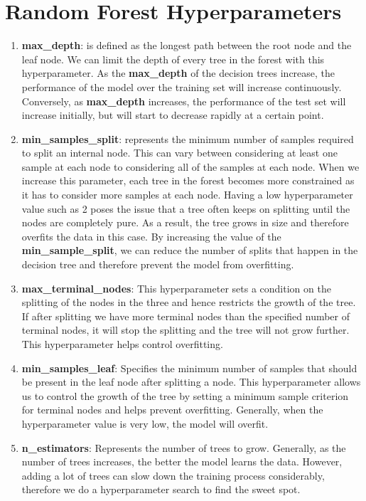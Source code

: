 \documentclass[12pt]{article}
\begin{document}
\section{Random Forest Hyperparameters}
\begin{enumerate}
    \item \textbf{max\_depth}: is defined as the longest path between the root node and the leaf node. We can limit the depth of every tree in the forest with this hyperparameter. As the \textbf{max\_depth} of the decision trees increase, the performance of the model over the training set will increase continuously. Conversely, as \textbf{max\_depth} increases, the performance of the test set will increase initially, but will start to decrease rapidly at a certain point.
    
    \item \textbf{min\_samples\_split}: represents the minimum number of samples required to split an internal node.  This can vary between considering at least one sample at each node to considering all of the samples at each node. When we increase this parameter, each tree in the forest becomes more constrained as it has to consider more samples at each node. Having a low hyperparameter value such as 2 poses the issue that a tree often keeps on splitting until the nodes are completely pure. As a result, the tree grows in size and therefore overfits the data in this case. By increasing the value of the \textbf{min\_sample\_split}, we can reduce the number of splits that happen in the decision tree and therefore prevent the model from overfitting.
    
    \item \textbf{max\_terminal\_nodes}: This hyperparameter sets a condition on the splitting of the nodes in the three and hence restricts the growth of the tree. If after splitting we have more terminal nodes than the specified number of terminal nodes, it will stop the splitting and the tree will not grow further. This hyperparameter helps control overfitting.
    
    \item \textbf{min\_samples\_leaf}: Specifies the minimum number of samples that should be present in the leaf node after splitting a node. This hyperparameter allows us to control the growth of the tree by setting a minimum sample criterion for terminal nodes and helps prevent overfitting. Generally, when the hyperparameter value is very low, the model will overfit. 
    
    \item \textbf{n\_estimators}: Represents the number of trees to grow. Generally, as the number of trees increases, the better the model learns the data. However, adding a lot of trees can slow down the training process considerably, therefore we do a hyperparameter search to find the sweet spot. 
    

\end{enumerate}
\end{document}
